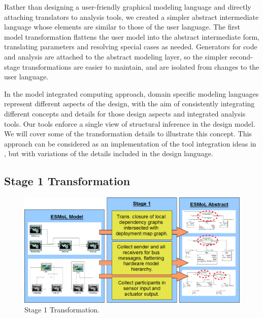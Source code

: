 Rather than designing a user-friendly graphical modeling 
language and directly attaching translators
to analysis tools, we created a simpler abstract 
intermediate language whose elements are similar to 
those of the user language. The first model transformation 
flattens the user model into the abstract intermediate form,
translating parameters and resolving special cases as needed. 
Generators for code and analysis are attached to the abstract 
modeling layer, so the simpler second-stage transformations 
are easier to maintain, and are isolated from changes to 
the user language.

In the model integrated computing approach, domain specific 
modeling languages represent different aspects of the design, 
with the aim  of consistently integrating different concepts 
and details for those design aspects and integrated analysis tools.
Our tools enforce a single view of structural inference in the 
design model. We will cover some of the transformation details 
to illustrate this concept.
This approach can be considered as an implementation of the tool 
integration ideas in \cite{modeling:hybrid_abs}, but with variations 
of the details included in the design language.  

\subsection{Stage 1 Transformation}
\label{sect:stage1}

\begin{figure}
\centering
\includegraphics[width=0.95\columnwidth]{figures/stage1.png}
   \caption{Stage 1 Transformation.}
   \label{fig:stage1}
\end{figure}


